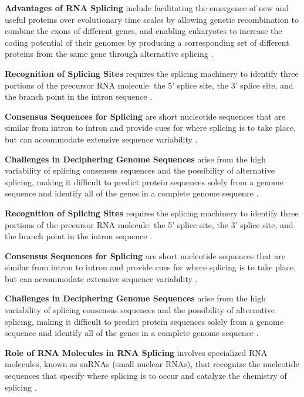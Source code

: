 \textbf{Advantages of RNA Splicing} include facilitating the emergence of new and useful proteins over evolutionary time scales by allowing genetic recombination to combine the exons of different genes, and enabling eukaryotes to increase the coding potential of their genomes by producing a corresponding set of different proteins from the same gene through alternative splicing \cite*{L1-Chapter6}.

\textbf{Recognition of Splicing Sites} requires the splicing machinery to identify three portions of the precursor RNA molecule: the 5' splice site, the 3' splice site, and the branch point in the intron sequence \cite*{L1-Chapter6}.

\textbf{Consensus Sequences for Splicing} are short nucleotide sequences that are similar from intron to intron and provide cues for where splicing is to take place, but can accommodate extensive sequence variability \cite*{L1-Chapter6}.

\textbf{Challenges in Deciphering Genome Sequences} arise from the high variability of splicing consensus sequences and the possibility of alternative splicing, making it difficult to predict protein sequences solely from a genome sequence and identify all of the genes in a complete genome sequence \cite*{L1-Chapter6}.

\textbf{Recognition of Splicing Sites} requires the splicing machinery to identify three portions of the precursor RNA molecule: the 5' splice site, the 3' splice site, and the branch point in the intron sequence \cite*{L1-Chapter6}.

\textbf{Consensus Sequences for Splicing} are short nucleotide sequences that are similar from intron to intron and provide cues for where splicing is to take place, but can accommodate extensive sequence variability \cite*{L1-Chapter6}.

\textbf{Challenges in Deciphering Genome Sequences} arise from the high variability of splicing consensus sequences and the possibility of alternative splicing, making it difficult to predict protein sequences solely from a genome sequence and identify all of the genes in a complete genome sequence \cite*{L1-Chapter6}.

\textbf{Role of RNA Molecules in RNA Splicing} involves specialized RNA molecules, known as snRNAs (small nuclear RNAs), that recognize the nucleotide sequences that specify where splicing is to occur and catalyze the chemistry of splicing \cite*{L1-Chapter6}.

